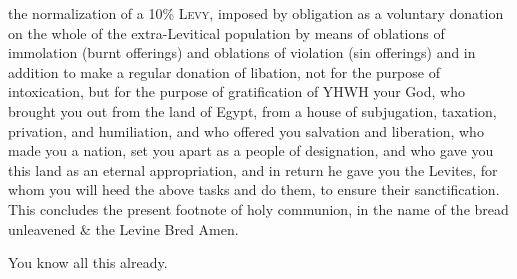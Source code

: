 {{{{{                        the normalization of a 10\% \textsc{Levy},
                        imposed by obligation as a voluntary donation
                        on the whole of the extra-Levitical population
                        by means of
                        oblations of immolation (burnt offerings)
                        and
                        oblations of violation (sin offerings)
                        and in addition to make a regular donation of libation,
                        not for the purpose of intoxication,
                        but for the purpose of gratification of
                        YHWH your God, who brought you out from the land of Egypt,
                        from a house of subjugation, taxation, privation, and humiliation,
                        and who offered you salvation and liberation,
                        who made you a nation, set you apart as a people of designation,
                        and who gave you this land as an eternal appropriation,
                        and in return he gave you the Levites, for whom you
                        will heed the above tasks and do them, to ensure their sanctification.
                        This concludes the present footnote of
                        holy communion,
                        in the name of the
                        bread unleavened \& the
                        Levine Bred
                        \;%
                        Amen.
                    }}%
                }

                You know all this already.

				\pagebreak[2]


}}
